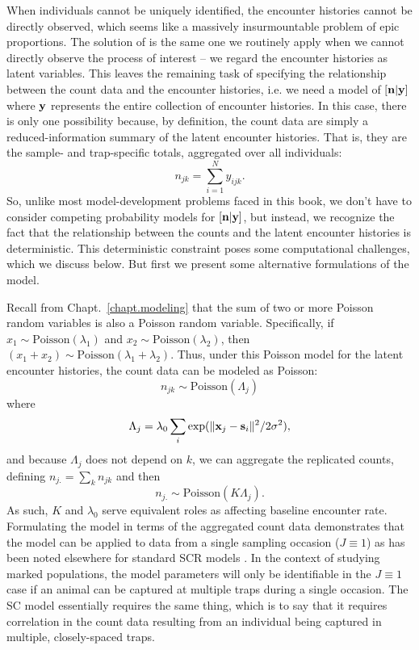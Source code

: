 When individuals cannot be uniquely identified, the encounter histories cannot
be directly observed, which seems like a massively insurmountable
problem of epic proportions.
The solution of \citet{chandler_royle:2012} is the same one we routinely apply when we
cannot directly observe the process of interest -- we regard the
encounter histories as latent variables. This leaves the remaining
task of specifying the relationship between the count data and
the encounter histories, i.e. we need a model of $[{\bf n}|{\bf y}]$
where $\bf y$ represents the entire collection of encounter
histories. In this case, there is only one possibility because, by
definition, the count data are simply a
reduced-information summary of the latent encounter histories. That
is, they are the sample- and trap-specific totals, aggregated over all
individuals:
\begin{equation}
n_{jk} = \sum_{i=1}^{N} y_{ijk}.
\label{unmarked.eq.ny}
\end{equation}
So, unlike most model-development problems faced in this book, we
don't have to consider competing probability models for
$[{\bf n}|{\bf y}]$, but instead, we recognize the fact that the
relationship between the counts and the latent encounter histories is
deterministic. This deterministic constraint poses some computational
challenges, which we discuss below. But first we present some
alternative formulations of the model.

Recall from Chapt.~\ref{chapt.modeling} that the sum of two or more
Poisson random variables is also a Poisson random variable.
Specifically,
if $x_1 \sim \text{Poisson}(\lambda_1)$ and
$x_2 \sim \text{Poisson}(\lambda_2)$, then $(x_1+x_2) \sim
\text{Poisson}(\lambda_1 + \lambda_2)$. Thus,
under this Poisson model for the latent encounter histories,
the count data can be modeled as Poisson:
\begin{equation}
n_{jk} \sim \mbox{Poisson}( \Lambda_{j} )
\label{eq:nagg}
\end{equation}
where
\[
 \Lambda_{j} = \lambda_0 \sum_{i} \exp(\| {\bf x}_j - {\bf s}_i \|^2 / 2\sigma^2),
\]
and because $\Lambda_j$ does not depend on $k$, we can
aggregate the replicated counts, defining
$n_{j.} = \sum_{k} n_{jk}$ and then
\[
 n_{j.} \sim \mbox{Poisson}( K \Lambda_{j} ).
\]
As such, $K$ and $\lambda_{0}$ serve equivalent roles as affecting
baseline encounter rate.
Formulating the model in terms of the aggregated count data
demonstrates that the model can be
applied to data from a single sampling occasion ($J \equiv 1$) as has
been noted elsewhere for standard SCR models
\citep{efford_etal:2009ecol}. In the context of studying marked
populations, the model parameters will only be identifiable in the
$J\equiv 1$ case if an animal can be captured at multiple traps during
a single occasion. The SC model essentially requires the same thing,
which is to say that it requires correlation in the count data
resulting from an individual being captured in multiple,
closely-spaced traps.

